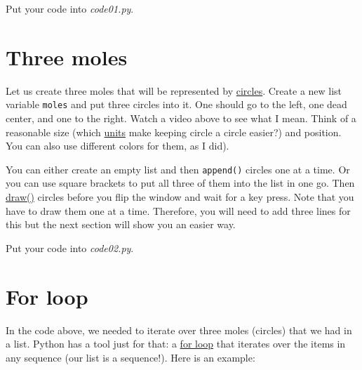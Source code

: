 \documentclass[
]{book}
\begin{document}
Put your code into \emph{code01.py}.

\hypertarget{three-moles}{%
\section{Three moles}\label{three-moles}}

Let us create three moles that will be represented by \href{https://psychopy.org/api/visual/circle.html\#psychopy.visual.circle.Circle}{circles}. Create a new list variable \texttt{moles} and put three circles into it. One should go to the left, one dead center, and one to the right. Watch a video above to see what I mean. Think of a reasonable size (which \protect\hyperlink{psychopy-units}{units} make keeping circle a circle easier?) and position. You can also use different colors for them, as I did).

You can either create an empty list and then \texttt{append()} circles one at a time. Or you can use square brackets to put all three of them into the list in one go. Then \href{https://psychopy.org/api/visual/circle.html\#psychopy.visual.circle.Circle.draw}{draw()} circles before you flip the window and wait for a key press. Note that you have to draw them one at a time. Therefore, you will need to add three lines for this but the next section will show you an easier way.

Put your code into \emph{code02.py}.

\hypertarget{for-loop}{%
\section{For loop}\label{for-loop}}

In the code above, we needed to iterate over three moles (circles) that we had in a list. Python has a tool just for that: a
\href{https://docs.python.org/3/tutorial/controlflow.html?highlight=loop\#for-statements}{for loop} that iterates over the items in any sequence (our list is a sequence!). Here is an example:
\end{document}
